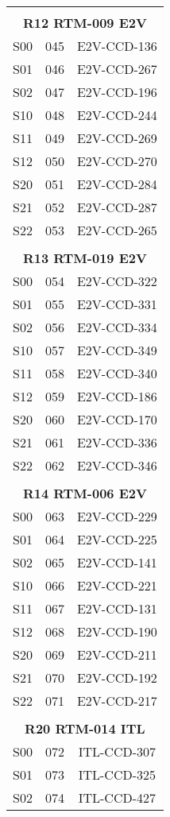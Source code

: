\begin{longtable}{ccc}
 & & \\
\multicolumn{3}{c}{\bf R12  RTM-009  E2V} \\
\hline
  S00 & 045 & E2V-CCD-136 \\
  S01 & 046 & E2V-CCD-267 \\
  S02 & 047 & E2V-CCD-196 \\
  S10 & 048 & E2V-CCD-244 \\
  S11 & 049 & E2V-CCD-269 \\
  S12 & 050 & E2V-CCD-270 \\
  S20 & 051 & E2V-CCD-284 \\
  S21 & 052 & E2V-CCD-287 \\
  S22 & 053 & E2V-CCD-265 \\
 & & \\
\multicolumn{3}{c}{\bf R13  RTM-019  E2V} \\
\hline
  S00 & 054 & E2V-CCD-322 \\
  S01 & 055 & E2V-CCD-331 \\
  S02 & 056 & E2V-CCD-334 \\
  S10 & 057 & E2V-CCD-349 \\
  S11 & 058 & E2V-CCD-340 \\
  S12 & 059 & E2V-CCD-186 \\
  S20 & 060 & E2V-CCD-170 \\
  S21 & 061 & E2V-CCD-336 \\
  S22 & 062 & E2V-CCD-346 \\
 & & \\
\multicolumn{3}{c}{\bf R14  RTM-006  E2V} \\
\hline
  S00 & 063 & E2V-CCD-229 \\
  S01 & 064 & E2V-CCD-225 \\
  S02 & 065 & E2V-CCD-141 \\
  S10 & 066 & E2V-CCD-221 \\
  S11 & 067 & E2V-CCD-131 \\
  S12 & 068 & E2V-CCD-190 \\
  S20 & 069 & E2V-CCD-211 \\
  S21 & 070 & E2V-CCD-192 \\
  S22 & 071 & E2V-CCD-217 \\
 & & \\
\multicolumn{3}{c}{\bf R20  RTM-014  ITL} \\
\hline
  S00 & 072 & ITL-CCD-307 \\
  S01 & 073 & ITL-CCD-325 \\
  S02 & 074 & ITL-CCD-427 \\

\end{longtable}
